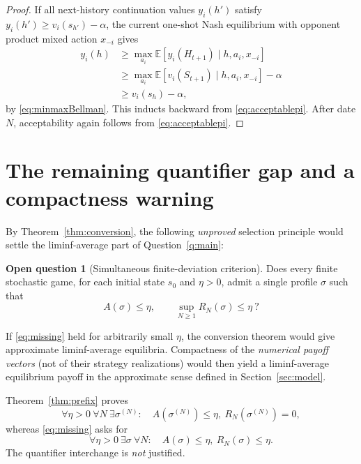 \documentclass[11pt,a4paper]{article}
\numberwithin{equation}{section}
\theoremstyle{definition}
\newtheorem{question}[theorem]{Open question}
\theoremstyle{remark}
\newcommand{\E}{\mathbb E}
\newcommand{\sig}{\sigma}
\begin{document}
\begin{proof}
If all next-history continuation values $y_i(h')$ satisfy
$y_i(h')\ge v_i(s_{h'})-\alpha$, the current one-shot Nash equilibrium
with opponent product mixed action $x_{-i}$ gives
\[
\begin{split}
 y_i(h)
 &\ge\max_{a_i}\E[y_i(H_{t+1})\mid h,a_i,x_{-i}]\\
 &\ge\max_{a_i}\E[v_i(S_{t+1})\mid h,a_i,x_{-i}]-\alpha\\
 &\ge v_i(s_h)-\alpha,
\end{split}
\]
by \eqref{eq:minmaxBellman}. This inducts backward from
\eqref{eq:acceptablepi}. After date $N$, acceptability again follows
from \eqref{eq:acceptablepi}.
\end{proof}

\section{The remaining quantifier gap and a compactness warning}
\label{sec:gap}
By Theorem~\ref{thm:conversion}, the following \emph{unproved}
selection principle would settle the liminf-average part of
Question~\ref{q:main}:
\begin{question}[Simultaneous finite-deviation criterion]\label{q:criterion}
Does every finite stochastic game, for each initial state $s_0$ and
$\eta>0$, admit a single profile $\sig$ such that
\begin{equation}\label{eq:missing}
 A(\sig)\le\eta,
 \qquad \sup_{N\ge1}R_N(\sig)\le\eta\ ?
\tag{FD}
\end{equation}
\end{question}
If \eqref{eq:missing} held for arbitrarily small $\eta$, the conversion
theorem would give approximate liminf-average equilibria. Compactness of
the \emph{numerical payoff vectors} (not of their strategy realizations)
would then yield a liminf-average equilibrium payoff in the approximate
sense defined in Section~\ref{sec:model}.

Theorem~\ref{thm:prefix} proves
\begin{equation}\label{eq:quantifiers}
 \forall\eta>0\ \forall N\ \exists\sig^{(N)}:
 \quad A(\sig^{(N)})\le\eta,\ R_N(\sig^{(N)})=0,
\end{equation}
whereas \eqref{eq:missing} asks for
\[
 \forall\eta>0\ \exists\sig\ \forall N:
 \quad A(\sig)\le\eta,\ R_N(\sig)\le\eta.
\]
The quantifier interchange is \emph{not} justified.
\end{document}
